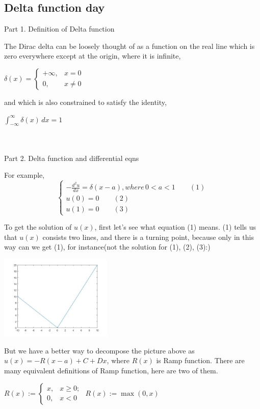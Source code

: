 \documentclass{article}
\newenvironment{nscenter}
{\parskip=0pt\par\nopagebreak\centering}
{\par\noindent\ignorespacesafterend}
\begin{document}
\begin{spacing}{1.5}
\section{Delta function day}
Part 1. Definition of Delta function

The Dirac delta can be loosely thought of as a function on the real line which is zero everywhere except at the origin, where it is infinite,
\begin{nscenter}
${\displaystyle \delta (x)={\begin{cases}+\infty ,&x=0\\0,&x\neq 0\end{cases}}}$
\end{nscenter}
and which is also constrained to satisfy the identity,
\begin{nscenter}
	${\displaystyle \int _{-\infty }^{\infty }\delta (x)\,dx=1}$
\end{nscenter}
\\\\Part 2. Delta function and differential eqns

For example, 
$$
\begin{cases}
-\frac{d^2u}{dx}=\delta(x-a), where \, 0 < a < 1 \qquad (1)\\
u(0)=0 \qquad (2)\\
u(1)=0 \qquad (3)
\end{cases}$$

To get the solution of $u(x)$, first let's see what equation (1) means. (1) tells us that $u(x)$ consists two lines, and there is a turning point, because only in this way can we get (1), for instance(not the solution for (1), (2), (3):)
\\\begin{center}
	\includegraphics[width=0.4\textwidth]{piecewise_func.jpg} \\ 
\end{center}

But we have a better way to decompose the picture above as $u(x) = -R(x-a) + C + Dx$, where $R(x)$ is Ramp function. There are many equivalent definitions of Ramp function, here are two of them. 
\begin{nscenter}
	$R(x):={\begin{cases}x,&x\geq 0;\\0,&x<0\end{cases}}$ \qquad ${\displaystyle R(x):=\operatorname {max} (0, x)} $
\end{nscenter}


\end{spacing}
\end{document}
